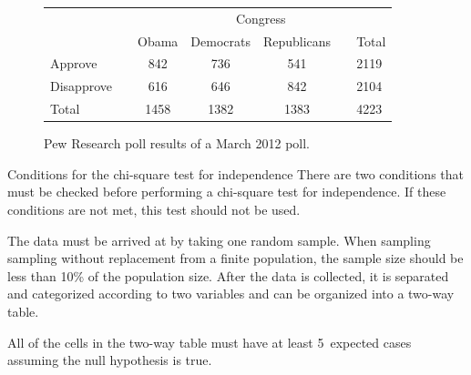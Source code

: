 \begin{figure}[h]
\centering
\begin{tabular}{ll ccc ll}
& & & \multicolumn{2}{c}{Congress} & \\
\cline{4-5}
 & \hspace{1mm} & Obama & Democrats & Republicans & \hspace{1mm} & Total \\
\hline
Approve				   & & 842    & 736 & 541   & 				& 2119 \\
Disapprove			   & & 616    & 646 & 842   &				& 2104 \\
\hline
Total					   & & 1458    & 1382 & 1383 & 				& 4223 \\
\hline
\end{tabular}
\caption{Pew Research poll results of a March 2012 poll.}
\label{pewResearchPollOnApprovalRatingsForChiSquareSectionExampleAndExercises}
\end{figure}

\begin{onebox}{Conditions for the chi-square test for independence}
There are two conditions that must be checked before performing a chi-square test for independence. If these conditions are not met, this test should not be used.\vspace{-1mm}
\begin{description}
\setlength{\itemsep}{0mm}
\item[Independence.] The data must be arrived at by taking one random sample. When sampling sampling without replacement from a finite population, the sample size should be less than 10\% of the population size.  After the data is collected, it is separated and categorized according to two variables and can be organized into a two-way table.
\item[Large expected counts.] All of the cells in the two-way table must have at least 5~expected cases assuming the null hypothesis is true.
\end{description}
\end{onebox}

\D{\newpage}

